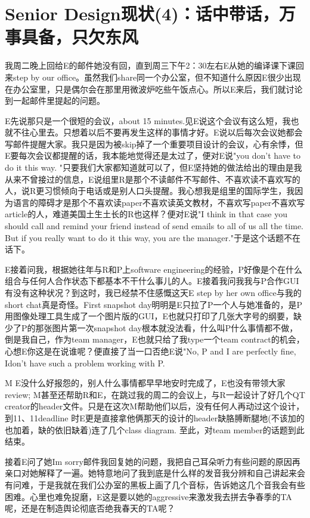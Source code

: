 \documentclass[12pt]{book}
\begin{document}
\section{Senior Design现状(4)：话中带话，万事具备，只欠东风}
\label{sec-21-4}
我周二晚上回给E的邮件她没有回，直到周三下午2：30左右E从她的编译课下课回来step by our office。虽然我们share同一个办公室，但不知道什么原因E很少出现在办公室里，只是偶尔会在那里用微波炉吃些午饭点心。所以E来后，我们就讨论到一起邮件里提起的问题。

E先说那只是一个很短的会议，about 15 minutes.见E说这个会议有这么短，我也就不往心里去。只想着以后不要再发生这样的事情才好。E说以后每次会议她都会写邮件提醒大家。我只是因为被skip掉了一个重要项目设计的会议，心有余悸，但E要每次会议都提醒的话，我本能地觉得还是太过了，便对E说"you don't have to do it this way. "只要我们大家都知道就可以了，但E坚持她的做法给出的理由是我从来不曾接过的信息，E说组里R是那个不读邮件不写邮件、不喜欢读不喜欢写的人，说R更习惯倾向于电话或是别人口头提醒。我心想我是组里的国际学生，我因为语言的障碍才是那个不喜欢读paper不喜欢读英文教材，不喜欢写paper不喜欢写article的人，难道美国土生土长的R也这样？便对E说"I think in that case you should call and remind your friend instead of send emails to all of us all the time. But if you really want to do it this way, you are the manager."于是这个话题不在话下。

E接着问我，根据她往年与R和P上software engineering的经验，P好像是个在什么组合与任何人合作状态下都基本不干什么事儿的人。E接着我问我我与P合作GUI有没有这种状况？到这时，我已经禁不住感慨这天E step by her own office与我的short chat真是奇怪。First snapshot day明明是E只拉了P一个人与她准备的，是P用图像处理工具生成了一个图片版的GUI，E也就只打印了几张大字号的纲要，缺少了P的那张图片第一次snapshot day根本就没法看，什么叫P什么事情都不做，倒是我自己，作为team manager，E也就只给了我type一个team contract的机会，心想E你这是在说谁呢？便直接了当一口否绝E说"No, P and I are perfectly fine, Idon't have such a problem working with P.

M E没什么好报怨的，别人什么事情都早早地安时完成了，E也没有带领大家review; M甚至还帮助R和E，在跳过我的周二的会议上，与R一起设计了好几个QT creator的header文件。只是在这次M帮助他们以后，没有任何人再动过这个设计，到11、11deadline 时E更是直接拿他俩那天的设计的header缺胳膊断腿地(不该加的也加着，缺的依旧缺着)连了几个class diagram. 至此，对team member的话题到此结束。

接着E问了她Im sorry邮件我回复她的问题，我把自己耳朵听力有些问题的原因再亲口对她解释了一遍。她特意地问了我到底是什么样的发音我分辨和自己讲起来会有问难，于是我就在我们公办室的黑板上画了几个音标，告诉她这几个音我会有些困难。心里也难免捉磨，E这是要以她的aggressive来激发我去拼去争春季的TA呢，还是在制造舆论彻底否绝我春天的TA呢？
\end{document}

